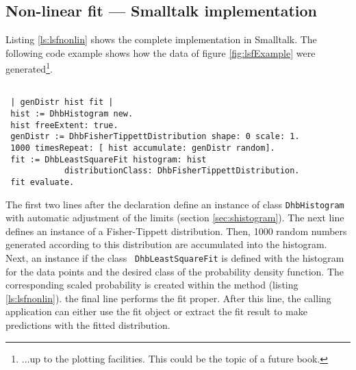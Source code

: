 \documentclass[twoside]{book}
\begin{document}

\subsection{Non-linear fit --- Smalltalk implementation}
\label{sec:slsfnonlin}Listing \ref{ls:lsfnonlin} shows the
complete implementation in Smalltalk. The following code example
shows how the data of figure \ref{fig:lsfExample} were
generated\footnote{$\ldots$up to the plotting facilities. This
could be the topic of a future book.}.
\begin{codeExample}
\label{exs:leastSquare}
\begin{verbatim}

 | genDistr hist fit |
 hist := DhbHistogram new.
 hist freeExtent: true.
 genDistr := DhbFisherTippettDistribution shape: 0 scale: 1.
 1000 timesRepeat: [ hist accumulate: genDistr random].
 fit := DhbLeastSquareFit histogram: hist
            distributionClass: DhbFisherTippettDistribution.
 fit evaluate.
\end{verbatim}
\end{codeExample}
The first two lines after the declaration define an instance of
class {\tt DhbHistogram} with automatic adjustment of the limits
(\cf section \ref{sec:shistogram}). The next line defines an
instance of a Fisher-Tippett distribution. Then, 1000 random
numbers generated according to this distribution are accumulated
into the histogram. Next, an instance if the class {\tt
DhbLeastSquareFit} is defined with the histogram for the data
points and the desired class of the probability density function.
The corresponding scaled probability is created within the method
(\cf listing \ref{ls:lsfnonlin}). the final line performs the fit
proper. After this line, the calling application can either use
the fit object or extract the fit result to make predictions with
the fitted distribution.
\end{document}
